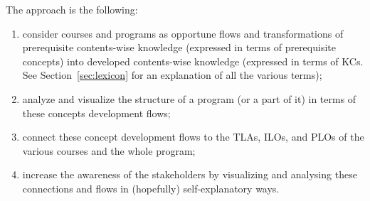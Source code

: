 The approach is the following: 
\begin{enumerate}
	\item consider courses and programs as opportune flows and transformations of prerequisite contents-wise knowledge (expressed in terms of prerequisite concepts) into developed contents-wise knowledge (expressed in terms of \acp{KC}. See Section~\ref{sec:lexicon} for an explanation of all the various terms); 
	\item analyze and visualize the structure of a program (or a part of it) in terms of these concepts development flows;
	\item connect these concept development flows to the \acp{TLA}, \acp{ILO}, and \acp{PLO} of the various courses and the whole program;
	\item increase the awareness of the stakeholders by visualizing and analysing these connections and flows in (hopefully) self-explanatory ways.
\end{enumerate}

